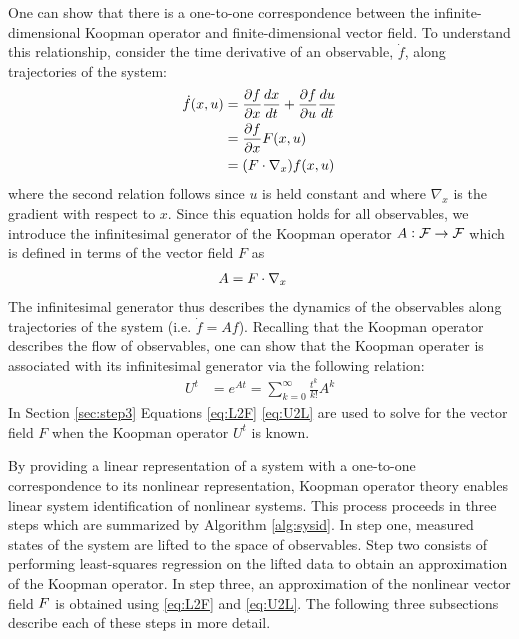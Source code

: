 One can show that there is a one-to-one correspondence between the infinite-dimensional Koopman operator and finite-dimensional vector field.
To understand this relationship, consider the time derivative of an observable, $\dot{f}$, along trajectories of the system:
\begin{align}
    \dot{f}(x,u) &= \frac{\partial f}{\partial x} \frac{dx}{dt} + \frac{\partial f}{\partial u}\frac{du}{dt} \\
           &= \frac{\partial f}{\partial x} F(x,u) \\
           &= ( F \cdot \nabla_{x} ) f(x,u)
    \label{eq:fdot}
\end{align}
where the second relation follows since $u$ is held constant and where $\nabla_x$ is the gradient with respect to $x$.
Since this equation holds for all observables, we introduce the infinitesimal generator of the Koopman operator ${A:\mathcal{F} \to \mathcal{F}}$ \cite[Equation 7.6.5]{lasota2013chaos} which is defined in terms of the vector field $F$ as
\begin{align}
    A &= F \cdot \nabla_{x}
    \label{eq:L2F}
\end{align}
The infinitesimal generator thus describes the dynamics of the observables along trajectories of the system (i.e. ${\dot{f}=Af}$). 
Recalling that the Koopman operator describes the flow of observables, one can show that the Koopman operater is associated with its infinitesimal generator via the following relation:
\begin{align}
    U^t &= e^{A t} = \sum_{k=0}^\infty \frac{t^k}{k!} A^k
    \label{eq:U2L}
\end{align}
In Section \ref{sec:step3} Equations \eqref{eq:L2F} \eqref{eq:U2L} are used to solve for the vector field $F$ when the Koopman operator $U^t$ is known.

By providing a linear representation of a system with a one-to-one correspondence to its nonlinear representation, Koopman operator theory enables linear system identification of nonlinear systems. 
This process proceeds in three steps which are summarized by Algorithm \ref{alg:sysid}.
In step one, measured states of the system are lifted to the space of observables.
Step two consists of performing least-squares regression on the lifted data to obtain an approximation of the Koopman operator.
In step three, an approximation of the nonlinear vector field $F$ is obtained using \eqref{eq:L2F} and \eqref{eq:U2L}.
The following three subsections describe each of these steps in more detail.


